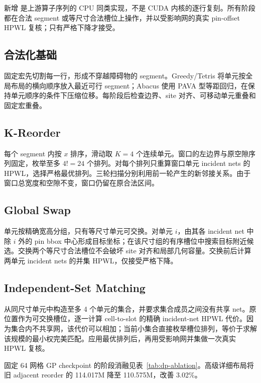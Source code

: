 \documentclass[11pt,a4paper]{ctexart}
\newcommand{\code}[1]{\texttt{\detokenize{#1}}}
\begin{document}
新增 \code{--dreamplace-detailed} 是上游算子序列的 CPU 同类实现，不是 CUDA 内核的逐行复刻。所有阶段都在合法 segment 或等尺寸合法槽位上操作，并以受影响网的真实 pin-offset HPWL 复核；只有严格下降才接受。

\subsection{合法化基础}

固定宏先切割每一行，形成不穿越障碍物的 segment。Greedy/Tetris 将单元按全局布局的横向顺序放入最近可行 segment；Abacus 使用 PAVA 型等距回归，在保持单元顺序的条件下压缩位移。每阶段后检查边界、site 对齐、可移动单元重叠和固定宏重叠。

\subsection{K-Reorder}

每个 segment 内按 $x$ 排序，滑动取 $K=4$ 个连续单元。窗口的左边界与原空隙序列固定，枚举至多 $4!=24$ 个排列。对每个排列只重算窗口单元 incident nets 的 HPWL，选择严格最优排列。三轮扫描分别利用前一轮产生的新邻接关系。由于窗口总宽度和空隙不变，窗口仍留在原合法区间。

\subsection{Global Swap}

单元按精确宽高分组，只有等尺寸单元可交换。对单元 $i$，由其各 incident net 中除 $i$ 外的 pin bbox 中心形成目标坐标；在该尺寸组的有序槽位中搜索目标附近候选。交换两个等尺寸合法槽位不会破坏 site 对齐和局部几何容量。交换前后计算两单元 incident nets 的并集 HPWL，仅接受严格下降。

\subsection{Independent-Set Matching}

从同尺寸单元中构造至多 4 个单元的集合，并要求集合成员之间没有共享 net。原位置作为可交换槽位，逐一计算 cell-to-slot 的精确 incident-net HPWL 代价。因为集合内不共享网，该代价可以相加；当前小集合直接枚举槽位排列，等价于求解该规模的最小权完美匹配。应用最优排列后，再用受影响网并集做一次真实 HPWL 复核。

固定 64 网格 GP checkpoint 的阶段消融见表~\ref{tab:dp-ablation}。高级详细布局将旧 adjacent reorder 的 114.017M 降至 110.575M，改善 3.02\%。
\end{document}
